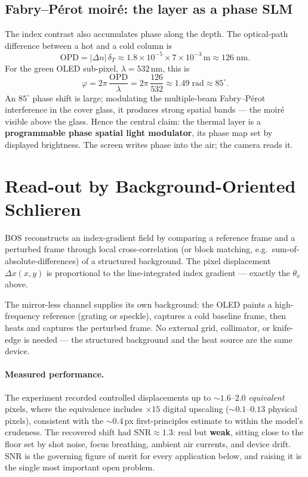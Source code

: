 \documentclass[11pt]{article}
\begin{document}
\subsection{Fabry--P\'erot moir\'e: the layer as a phase SLM}
The index contrast also accumulates phase along the depth. The optical-path difference between a
hot and a cold column is
\begin{equation}
\mathrm{OPD} = |\Delta n|\,\delta_T \approx 1.8\times10^{-5}\times7\times10^{-3}\,\mathrm{m}
\approx 126\;\mathrm{nm}.
\end{equation}
For the green OLED sub-pixel, $\lambda=532$\,nm, this is
\begin{equation}
\varphi = 2\pi\,\frac{\mathrm{OPD}}{\lambda} = 2\pi\,\frac{126}{532}
\approx 1.49\;\mathrm{rad}\approx 85^{\circ}.
\end{equation}
An $85^{\circ}$ phase shift is large; modulating the multiple-beam Fabry--P\'erot interference
in the cover glass, it produces strong spatial bands --- the moir\'e visible above the glass.
Hence the central claim: the thermal layer is a \textbf{programmable phase spatial light
modulator}, its phase map set by displayed brightness. The screen writes phase into the air;
the camera reads it.

\section{Read-out by Background-Oriented Schlieren}
BOS reconstructs an index-gradient field by comparing a reference frame and a perturbed frame
through local cross-correlation (or block matching, e.g.\ sum-of-absolute-differences) of a
structured background. The pixel displacement $\Delta x(x,y)$ is proportional to the
line-integrated index gradient --- exactly the $\theta_x$ above.

The mirror-less channel supplies its own background: the OLED paints a high-frequency reference
(grating or speckle), captures a cold baseline frame, then heats and captures the perturbed
frame. No external grid, collimator, or knife-edge is needed --- the structured background and
the heat source are the same device.

\paragraph{Measured performance.} The experiment recorded controlled displacements up to
$\sim1.6$--$2.0$ \emph{equivalent} pixels, where the equivalence includes $\times15$ digital
upscaling ($\sim0.1$--$0.13$ physical pixels), consistent with the $\sim0.4$\,px first-principles
estimate to within the model's crudeness. The recovered shift had $\mathrm{SNR}\approx 1.3$:
real but \textbf{weak}, sitting close to the floor set by shot noise, focus breathing, ambient
air currents, and device drift. SNR is the governing figure of merit for every application
below, and raising it is the single most important open problem.
\end{document}
